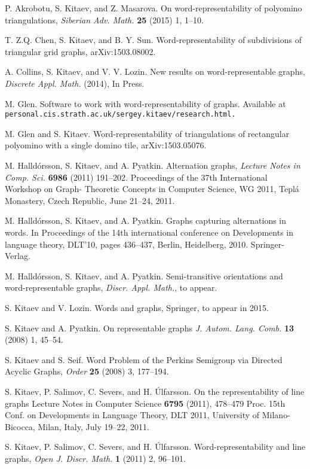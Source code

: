 \documentclass[12pt]{article}
\numberwithin{equation}{section}
\begin{document}
\begin{thebibliography}{13}

 P. Akrobotu, S. Kitaev, and Z. Masarova. On word-representability of polyomino triangulations, {\em Siberian Adv. Math.} {\bf 25} (2015) 1, 1--10.

 T. Z.Q. Chen, S. Kitaev, and B. Y. Sun. Word-representability of subdivisions of triangular grid graphs, arXiv:1503.08002.

 A. Collins, S. Kitaev, and V. V. Lozin. New results on word-representable graphs, {\em Discrete Appl. Math.} (2014), In Press.

 M. Glen. Software to work with word-representability of graphs. Available at \\ \verb>personal.cis.strath.ac.uk/sergey.kitaev/research.html.>

 M. Glen and S. Kitaev. Word-representability of triangulations of  rectangular polyomino with a single domino tile, arXiv:1503.05076.

 M. Halld\'{o}rsson, S. Kitaev, and A. Pyatkin. Alternation graphs, {\em Lecture Notes in Comp. Sci.} {\bf 6986} (2011) 191--202. Proceedings of the 37th International Workshop on Graph-
Theoretic Concepts in Computer Science, WG 2011, Tepl\'{a} Monastery, Czech Republic, June 21--24, 2011.

 M. Halld\'{o}rsson, S. Kitaev, and A. Pyatkin. Graphs capturing alternations in words. In Proceedings of the 14th international conference on Developments in language theory, DLT'10, pages 436--437, Berlin, Heidelberg, 2010. Springer-Verlag.

 M. Halld\'{o}rsson, S. Kitaev, and A. Pyatkin. Semi-transitive orientations and word-representable graphs, {\em Discr. Appl. Math.}, to appear.

 S. Kitaev and V. Lozin. Words and graphs, Springer, to appear in 2015.

 S. Kitaev and A. Pyatkin. On representable graphs {\em J. Autom. Lang. Comb.} {\bf 13} (2008) 1, 45--54.

 S. Kitaev and S. Seif. Word Problem of the Perkins
Semigroup via Directed Acyclic Graphs, {\em Order} {\bf 25} (2008) 3, 177--194.

 S. Kitaev, P. Salimov, C. Severs, and H. \'{U}lfarsson. On the representability of line graphs Lecture Notes in Computer Science {\bf 6795} (2011), 478--479 Proc. 15th Conf. on Developments in Language Theory, DLT 2011, University of Milano-Bicocca, Milan, Italy, July 19--22, 2011.

 S. Kitaev, P. Salimov, C. Severs, and H. \'{U}lfarsson. Word-representability and line graphs, {\em Open J. Discr. Math.} {\bf 1} (2011) 2, 96--101.

\end{thebibliography}
\end{document}
